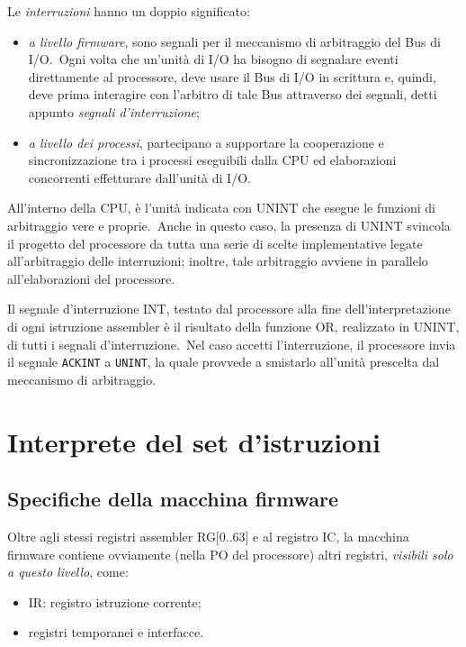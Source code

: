 Le \textit{interruzioni} hanno un doppio significato:

\begin{itemize}
    \item \textit{a livello firmware}, sono segnali per il meccanismo di arbitraggio del Bus di I/O.\ Ogni volta che un'unità di I/O ha bisogno di segnalare eventi direttamente al processore, deve usare il Bus di I/O in scrittura e, quindi, deve prima interagire con l'arbitro di tale Bus attraverso dei segnali, detti appunto \textit{segnali d'interruzione};
    \item \textit{a livello dei processi}, partecipano a supportare la cooperazione e sincronizzazione tra i processi eseguibili dalla CPU ed elaborazioni concorrenti effetturare dall'unità di I/O.
\end{itemize}

\noindent All'interno della CPU, è l'unità indicata con UNINT che esegue le funzioni di arbitraggio vere e proprie.\
Anche in questo caso, la presenza di UNINT svincola il progetto del processore da tutta una serie di scelte implementative legate all'arbitraggio delle interruzioni; inoltre, tale arbitraggio avviene in parallelo all'elaborazioni del processore.

Il segnale d'interruzione INT, testato dal processore alla fine dell'interpretazione di ogni istruzione assembler è il risultato della funzione OR, realizzato in UNINT, di tutti i segnali d'interruzione.\
Nel caso accetti l'interruzione, il processore invia il segnale \texttt{ACKINT} a \texttt{UNINT}, la quale provvede a smistarlo all'unità prescelta dal meccanismo di arbitraggio.

\section{Interprete del set d'istruzioni}

\subsection{Specifiche della macchina firmware}

Oltre agli stessi registri assembler RG[0..63] e al registro IC, la macchina firmware contiene ovviamente
(nella PO del processore) altri registri, \textit{visibili solo a questo livello}, come:

\begin{itemize}
    \item IR: registro istruzione corrente;
    \item registri temporanei e interfacce.
\end{itemize}

